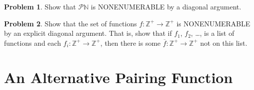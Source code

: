 \documentclass[10pt,a4paper]{article}
\newcommand*{\olup}[1]{\MakeUppercase{#1}}
\theoremstyle{plain}
\theoremstyle{definition}
\newtheorem{prob}{Problem}[section]
\theoremstyle{remark}
\newcommand*{\olfileid}[3]{}
\newcommand*{\olsection}[1]{\section*{#1}}
\providecommand{\Nat}{\ensuremath{\mathbb{N}}}
\providecommand{\PosInt}{\mathbb{Z}^{+}}
\providecommand{\Pow}{\mathcal{P}}
\begin{document}
\begin{prob}
Show that $\Pow{\Nat}$ is \olup{nonenumerable} by a diagonal argument.
\end{prob}

\begin{prob}\label{sfr:siz:nen:prob:f-posint}
Show that the set of functions $f \colon \PosInt \to \PosInt$ is
\olup{nonenumerable} by an explicit diagonal argument. That is, show that
if $f_1$, $f_2$, \dots, is a list of functions and each $f_i\colon
\PosInt \to \PosInt$, then there is some $\overline{f}\colon \PosInt \to
\PosInt$ not on this list.
\end{prob}





\olfileid{sfr}{siz}{pai-alt}

\olsection{An Alternative Pairing Function}
\end{document}
